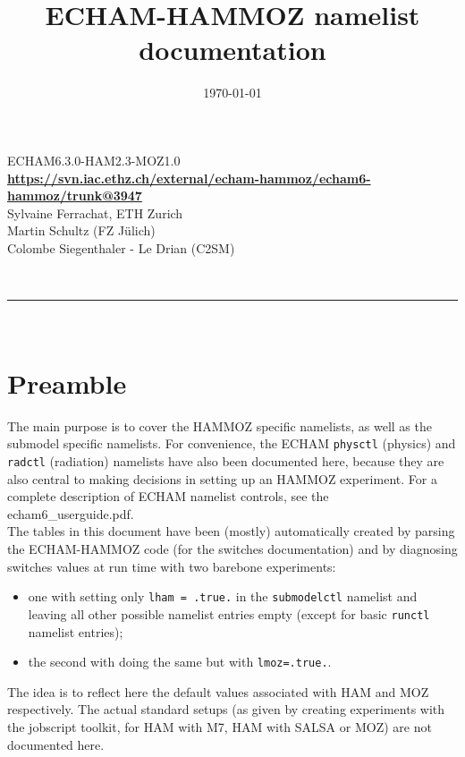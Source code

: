 \documentclass[landscape, 11pt]{article}
\title{ECHAM-HAMMOZ namelist documentation}
\date{\today}                                           %
\begin{document}
\maketitle
\begin{center}
{\Large ECHAM6.3.0-HAM2.3-MOZ1.0}\\[0.5cm]
{\bf \url{https://svn.iac.ethz.ch/external/echam-hammoz/echam6-hammoz/trunk@3947}}\\[1cm]
Sylvaine Ferrachat, ETH Zurich\\
Martin Schultz (FZ J\"ulich)\\
Colombe Siegenthaler - Le Drian (C2SM)
\end{center}
~\\

\noindent\rule{\linewidth}{0.5mm}\\[1cm]
\tableofcontents


\newpage

\section{Preamble}
The main purpose is to cover the HAMMOZ specific namelists, as well as the submodel specific namelists. For convenience, the ECHAM \texttt{physctl} (physics) and \texttt{radctl} (radiation) namelists have also been documented here, because they are also central to making decisions in setting up an HAMMOZ experiment. For a complete description of ECHAM namelist controls, see  the echam6\_userguide.pdf.\\

The tables in this document have been (mostly) automatically created by parsing the ECHAM-HAMMOZ code (for the switches documentation) and by diagnosing switches values at run time with two barebone experiments:
\begin{itemize}
        \item one with setting only \texttt{lham = .true.} in the \texttt{submodelctl} namelist and leaving all other possible namelist entries empty (except for basic \texttt{runctl} namelist entries);
        \item the second with doing the same but with \texttt{lmoz=.true.}.
\end{itemize}
The idea is to reflect here the default values associated with HAM and MOZ respectively. The actual standard setups (as given by creating experiments with the jobscript toolkit, for HAM with M7, HAM with SALSA or MOZ) are not documented here.\\
\end{document}
